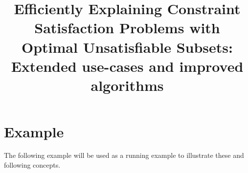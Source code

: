 \documentclass[twoside,11pt]{article}
\begin{document}
	

\title{Efficiently Explaining Constraint Satisfaction Problems with Optimal Unsatisfiable Subsets: Extended use-cases and improved algorithms}

\author{}

\researchnote

\maketitle


\section{Example}
The following example will be used as a running example to illustrate these and following concepts.
\end{document}
